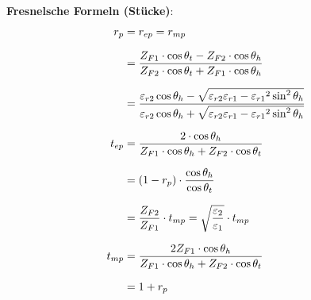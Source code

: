 \textbf{Fresnelsche Formeln (Stücke)}:
\begin{equation*}
		\setlength{\jot}{10pt}
	\begin{aligned}
		r_p    & =  r_{ep} = r_{mp}                                                                                                                                                                                                     \\
		& = \frac{Z_{F1} \cdot \cos \theta_t-Z_{F2} \cdot \cos \theta_h}{Z_{F2} \cdot \cos \theta_t+Z_{F1} \cdot \cos \theta_h}                                                                                      \\
		& = \frac{\varepsilon_{r2}\cos\theta_h-\sqrt{\varepsilon_{r2}\varepsilon_{r1}-{\varepsilon_{r1}}^2\sin^2\theta_h}}{\varepsilon_{r2}\cos\theta_h+\sqrt{{\varepsilon_{r2}\varepsilon_{r1}-{\varepsilon_{r1}}^2\sin^2\theta_h}}} \\
		t_{ep} & =  \frac{2  \cdot \cos \theta_h}{Z_{F1} \cdot \cos \theta_h+Z_{F2} \cdot \cos \theta_t}                                                                                                                          \\
		& = (1-r_p) \cdot \dfrac{\cos \theta_h}{\cos \theta_t}                                                                                                                                                                        \\
		& = \frac{Z_{F2}}{Z_{F1}}\cdot t_{mp} = \sqrt{\frac{\varepsilon_2}{\varepsilon_1}}\cdot t_{mp} \\
		t_{mp} & = \frac{2 Z_{F1}\cdot \cos \theta_h}{Z_{F1} \cdot \cos \theta_h+Z_{F2} \cdot \cos \theta_t}                                                                                                                          \\
		& = 1+r_p                                                                                                                                                                                                                
	\end{aligned}
\end{equation*}

